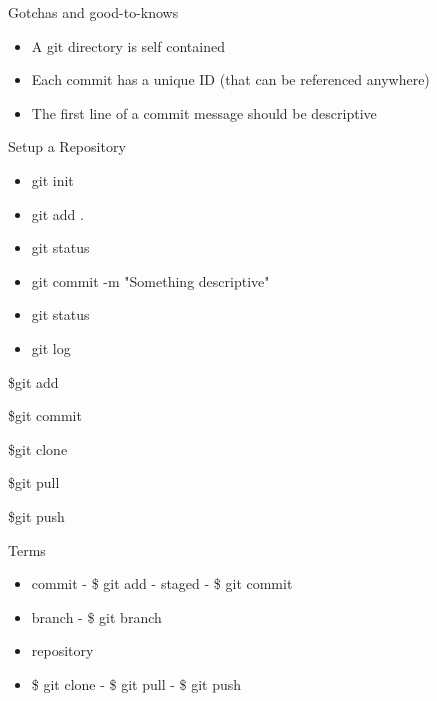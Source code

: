 \documentclass{beamer}
\begin{document}
\begin{frame}{Gotchas and good-to-knows}
  \begin{center}
    \begin{itemize}
      \item A git directory is self contained
      \item Each commit has a unique ID (that can be referenced
        anywhere)
      \item The first line of a commit message should be descriptive
    \end{itemize}
  \end{center}
\end{frame}

\begin{frame}{Setup a Repository}
  \begin{center}
    \begin{itemize}
      \item git init
      \item git add .
      \item git status
      \item git commit -m "Something descriptive"
      \item git status
      \item git log
    \end{itemize}
  \end{center}
\end{frame}

\begin{frame}{\$git add}
\end{frame}

\begin{frame}{\$git commit}
\end{frame}

\begin{frame}{\$git clone}
\end{frame}

\begin{frame}{\$git pull}
\end{frame}

\begin{frame}{\$git push}
\end{frame}

\begin{frame}{Terms}
  \begin{center}
    \begin{itemize}
      \item commit - \$ git add - staged - \$ git commit
      \item branch - \$ git branch
      \item repository
      \item \$ git clone - \$ git pull - \$ git push
    \end{itemize}
  \end{center}
\end{frame}
\end{document}
